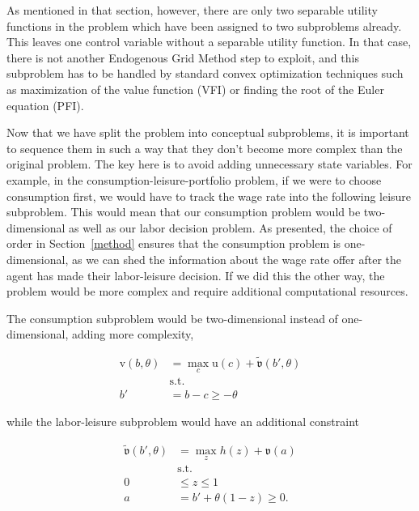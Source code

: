 \documentclass{article}
\newcommand{\tShkEmp}{\theta}
\newcommand{\h}{h}
\newcommand{\bRat}{b}
\newcommand{\leisure}{z}
\newcommand{\cRat}{c}
\newcommand{\vFunc}{\mathrm{v}}
\newcommand{\aRat}{a}
\newcommand{\vOpt}{\tilde{\mathfrak{v}}}
\newcommand{\vEnd}{\mathfrak{v}}
\newcommand{\uFunc}{\mathrm{u}}
\begin{document}
As mentioned in that section, however, there are only two separable utility functions in the problem which have been assigned to two subproblems already. This leaves one control variable without a separable utility function. In that case, there is not another Endogenous Grid Method step to exploit, and this subproblem has to be handled by standard convex optimization techniques such as maximization of the value function (VFI) or finding the root of the Euler equation (PFI).


Now that we have split the problem into conceptual subproblems, it is important to sequence them in such a way that they don't become more complex than the original problem. The key here is to avoid adding unnecessary state variables. For example, in the consumption-leisure-portfolio problem, if we were to choose consumption first, we would have to track the wage rate into the following leisure subproblem. This would mean that our consumption problem would be two-dimensional as well as our labor decision problem. As presented, the choice of order in Section~\ref{method} ensures that the consumption problem is one-dimensional, as we can shed the information about the wage rate offer after the agent has made their labor-leisure decision. If we did this the other way, the problem would be more complex and require additional computational resources.

The consumption subproblem would be two-dimensional instead of one-dimensional, adding more complexity,

\begin{equation}
\begin{split}
        \vFunc(\bRat, \tShkEmp) & = \max_{\cRat} \uFunc(\cRat) + \vOpt(\bRat', \tShkEmp) \\
        & \text{s.t.}\\
        \bRat' & = \bRat - \cRat \ge - \tShkEmp
    \end{split}
\end{equation}

while the labor-leisure subproblem would have an additional constraint

\begin{equation}
\begin{split}
        \vOpt(\bRat', \tShkEmp) & = \max_{\leisure} \h(\leisure) + \vEnd(\aRat) \\
        & \text{s.t.} \\
        0 & \le \leisure \le 1 \\
        \aRat & = \bRat' + \tShkEmp(1 - \leisure) \ge 0.
    \end{split}
\end{equation}
\end{document}

